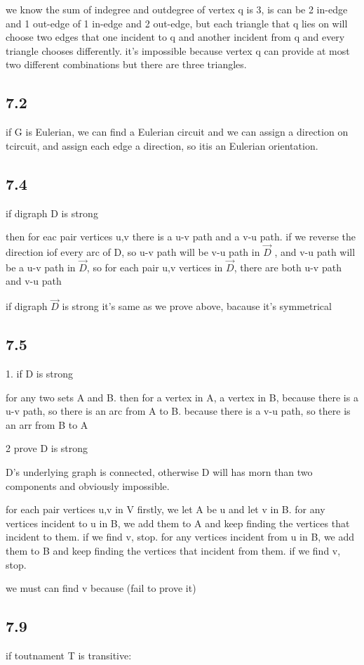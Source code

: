 \documentclass[a4paper,UTF8]{article}
\theoremstyle{definition}
\begin{document}
we know the sum of indegree and outdegree of vertex q is 3, is can be 2 in-edge and 1 out-edge of
1 in-edge and 2 out-edge, but each triangle that q lies on will choose two edges that  one incident to
q and another incident from q and every triangle chooses differently. it's impossible because vertex q
can provide at most two different combinations but there are three triangles.

\subsection*{7.2}
if G is Eulerian, we can find a Eulerian circuit and we can assign a direction on tcircuit, and assign each edge a direction, so itis an Eulerian orientation.
\subsection*{7.4}
if digraph D is strong

then for eac pair vertices u,v there is a u-v path and a v-u path.
if we reverse the direction iof every arc of D, so u-v path will be v-u path in $\vec D$ , and v-u path
will be a u-v path in $\vec D$, so for each pair  u,v vertices in $\vec D$, there are both u-v path and v-u path

if digraph $\vec D$ is strong
it's same as we prove above, bacause it's symmetrical

\subsection*{7.5}
1. if D is strong

for any two sets A and B.
then for a vertex in A, a vertex in B, because there is a u-v path, so there is an arc from A to B.
because there is a v-u path, so there is an arr from B to A

2 prove D is strong

D's underlying graph is connected, otherwise D will has morn than two components and obviously impossible.

for each pair vertices u,v in V
firstly, we let A be {u} and let v in B. for any vertices incident to u in B, we add them to A and keep finding the vertices that incident to them. if we find v, stop.
for any vertices incident from u in B, we add them to B and keep finding the vertices that incident from them. if we find v, stop.

we must can find v because (fail to prove it)


\subsection*{7.9}
if toutnament T is transitive:
\end{document}
